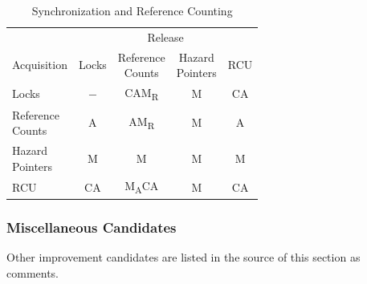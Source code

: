 \begin{table}
\renewcommand*{\arraystretch}{1.25}
\small
\centering
\begin{tabular}{lcccc}
	\toprule
	& \multicolumn{4}{c}{Release} \\
	\cmidrule(l){2-5}
	Acquisition	& Locks
				& \parbox[c]{.5in}{Reference\\Counts}
					& \parbox[c]{.5in}{Hazard\\Pointers}
						& RCU \\
	 \cmidrule(l){2-5}
	Locks		& $-$	& CAM\textsubscript{R}	& M	& CA  \\
	\parbox[c][6ex]{.6in}{Reference\\Counts}
			& A	& AM\textsubscript{R}    & M	& A   \\
	\parbox[c][6ex]{.6in}{Hazard\\Pointers}
			& M	& M	& M	& M   \\
	RCU		& CA	& M\textsubscript{A}CA	& M	& CA  \\
	\bottomrule
\end{tabular}

\vspace{5pt}\hfill
{}
\caption{Synchronization and Reference Counting}
\label{tab:app:styleguide:Synchronization and Reference Counting}
\end{table}



\FloatBarrier

\subsubsection{Miscellaneous Candidates}
\label{sec:app:styleguide:Miscellaneous Candidates}

Other improvement candidates are listed in the source of this
section as comments.

%
%
